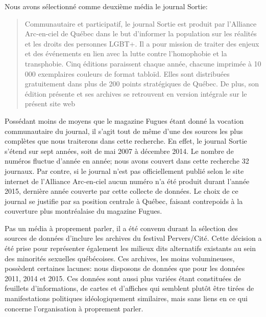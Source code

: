 

Nous avons sélectionné comme deuxième média le journal Sortie:
\blockquote[{\cite{AllianceArc2014}}][.]{ Communautaire et participatif, le journal Sortie est produit par l’Alliance Arc-en-ciel de Québec dans le but d’informer la population sur les réalités et les droits des personnes LGBT+.
  Il a pour mission de traiter des enjeux et des événements en lien avec la lutte contre l’homophobie et la transphobie. 
Cinq éditions paraissent chaque année, chacune imprimée à 10 000 exemplaires couleurs de format tabloïd. 
Elles sont distribuées gratuitement dans plus de 200 points stratégiques de Québec.
  De plus, son édition présente et ses archives se retrouvent en version intégrale sur le présent site web} 
Possédant moins de moyens que le magazine Fugues étant donné la vocation communautaire du journal, il s'agit tout de même d'une des sources les plus complètes que nous traiterons dans cette recherche.
En effet, le journal Sortie s'étend sur sept années, soit de mai 2007 à décembre 2014. 
Le nombre de numéros fluctue d'année en année; nous avons couvert dans cette recherche 32 journaux. 
Par contre, si le journal n'est pas officiellement publié selon le site internet de l'Alliance Arc-en-ciel aucun numéro n'a été produit durant l'année 2015, dernière année couverte par cette collecte de données. 
Le choix de ce journal se justifie par sa position centrale à Québec, faisant contrepoids à la couverture plus montréalaise du magazine Fugues.

Pas un média à proprement parler, il a été convenu durant la sélection des sources de données d'inclure les archives du festival Pervers/Cité. 
Cette décision a été prise pour représenter également les milieux dits alternatifs existants au sein des minorités sexuelles québécoises. 
Ces archives, les moins volumineuses, possèdent certaines lacunes: nous disposons de données que pour les données 2011, 2014 et 2015. 
Ces données sont aussi plus variées étant constituées de feuillets d'informations, de cartes et d'affiches qui semblent plutôt être tirées de manifestations politiques idéologiquement similaires, mais sans liens en ce qui concerne l'organisation à proprement parler.

